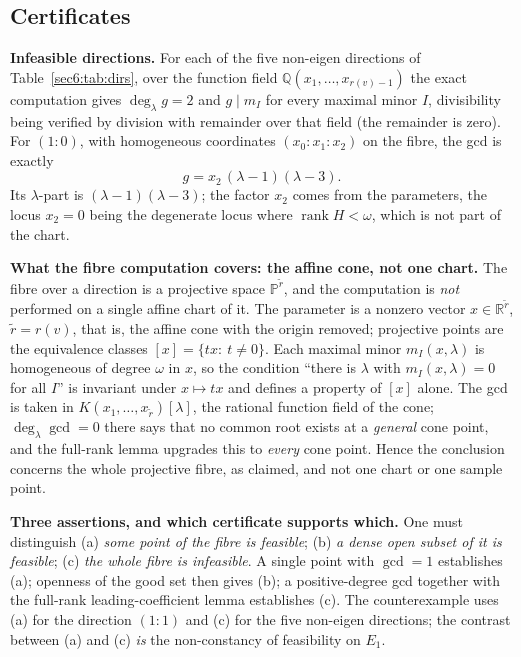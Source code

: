 \documentclass[journal]{IEEEtran}
\theoremstyle{plainn}
\theoremstyle{remark}
\newcommand{\rank}{\operatorname{rank}}
\begin{document}
\subsection{Certificates}\label{sec6:sub:cert}

\textbf{Infeasible directions.} For each of the five non-eigen directions of Table~\ref{sec6:tab:dirs},
over the function field $\mathbb{Q}(x_1,\dots,x_{r(v)-1})$ the exact computation gives
$\deg_\lambda g=2$ and $g\mid m_I$ for every maximal minor $I$, divisibility being verified by division
with remainder over that field (the remainder is zero). For $(1\!:\!0)$, with homogeneous coordinates
$(x_0\!:\!x_1\!:\!x_2)$ on the fibre, the gcd is exactly
\begin{equation}\label{sec6:eq:gexplicit}
g=x_2\,(\lambda-1)(\lambda-3).
\end{equation}
Its $\lambda$-part is $(\lambda-1)(\lambda-3)$; the factor $x_2$ comes from the parameters, the locus
$x_2=0$ being the degenerate locus where $\rank H<\omega$, which is not part of the chart.

\textbf{What the fibre computation covers: the affine cone, not one chart.} The fibre over a direction
is a projective space $\mathbb P^{\tilde r}$, and the computation is \emph{not} performed on a single
affine chart of it. The parameter is a nonzero vector $x\in\mathbb R^{\tilde r}$, $\tilde r=r(v)$, that is,
the affine cone with the origin removed; projective points are the equivalence classes
$[x]=\{tx:\ t\ne0\}$. Each maximal minor $m_I(x,\lambda)$ is homogeneous of degree $\omega$ in $x$, so
the condition ``there is $\lambda$ with $m_I(x,\lambda)=0$ for all $I$'' is invariant under
$x\mapsto tx$ and defines a property of $[x]$ alone. The gcd is taken in $K(x_1,\dots,x_{\tilde r})[\lambda]$,
the rational function field of the cone; $\deg_\lambda\gcd=0$ there says that no common root exists at
a \emph{general} cone point, and the full-rank lemma upgrades this to \emph{every} cone point. Hence the
conclusion concerns the whole projective fibre, as claimed, and not one chart or one sample point.

\textbf{Three assertions, and which certificate supports which.} One must distinguish
(a) \emph{some point of the fibre is feasible}; (b) \emph{a dense open subset of it is feasible};
(c) \emph{the whole fibre is infeasible}. A single point with $\gcd=1$ establishes (a); openness of the
good set then gives (b); a positive-degree gcd together with the full-rank leading-coefficient lemma
establishes (c). The counterexample uses (a) for the direction $(1\!:\!1)$ and (c) for the five
non-eigen directions; the contrast between (a) and (c) \emph{is} the non-constancy of feasibility on
$E_1$.
\end{document}
